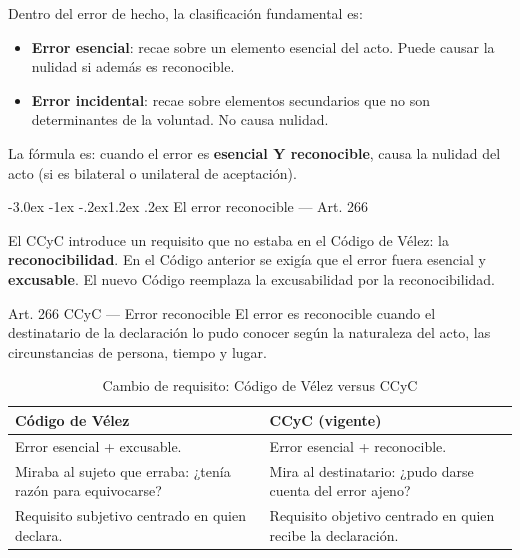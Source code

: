 \documentclass[12pt,oneside]{book}
\makeatletter
\renewcommand\section{\@startsection{section}{1}{\z@}%
  {-3.0ex \@plus -1ex \@minus -.2ex}{1.2ex \@plus .2ex}%
  {\normalfont\large\bfseries\color{acento}}}
\makeatother
\begin{document}
Dentro del error de hecho, la clasificación fundamental es:

\begin{itemize}
    \item \textbf{Error esencial}: recae sobre un elemento esencial del acto. Puede causar la nulidad si además es reconocible.
    \item \textbf{Error incidental}: recae sobre elementos secundarios que no son determinantes de la voluntad. No causa nulidad.
\end{itemize}

La fórmula es: cuando el error es \textbf{esencial Y reconocible}, causa la nulidad del acto (si es bilateral o unilateral de aceptación).

\section{El error reconocible --- Art. 266}

El CCyC introduce un requisito que no estaba en el Código de Vélez: la \textbf{reconocibilidad}. En el Código anterior se exigía que el error fuera esencial y \textbf{excusable}. El nuevo Código reemplaza la excusabilidad por la reconocibilidad.

\begin{articulo}{Art. 266 CCyC --- Error reconocible}
El error es reconocible cuando el destinatario de la declaración lo pudo conocer según la naturaleza del acto, las circunstancias de persona, tiempo y lugar.
\end{articulo}

\begin{table}[H]
\centering
\begin{tabularx}{\textwidth}{>{\raggedright\arraybackslash}X >{\raggedright\arraybackslash}X}
\toprule
\textbf{Código de Vélez} & \textbf{CCyC (vigente)} \\
\midrule
Error esencial + excusable. & Error esencial + reconocible. \\[4pt]
Miraba al sujeto que erraba: ¿tenía razón para equivocarse? & Mira al destinatario: ¿pudo darse cuenta del error ajeno? \\[4pt]
Requisito subjetivo centrado en quien declara. & Requisito objetivo centrado en quien recibe la declaración. \\
\bottomrule
\end{tabularx}
\caption{Cambio de requisito: Código de Vélez versus CCyC}
\end{table}
\end{document}
